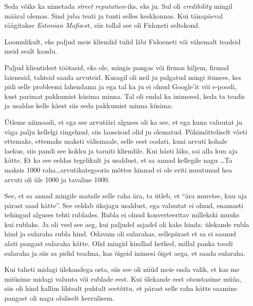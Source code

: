 
Seda võiks ka nimetada \emph{street reputation}-iks, eks ju. Sul oli \emph{credibility} mingil määral olemas. Sind juba teati ja tunti selles keskkonnas. Kui tänapäeval räägitakse \emph{Estonian Mafia}-st, siis tollal see oli Fidoneti seltskond.

Loomulikult, eks paljud meie kliendid tulid läbi Fidoeneti või vähemalt teadsid meid sealt kaudu.

Paljud klientidest töötasid, eks ole, mingis pangas või firmas hiljem, firmad laienesid, tahtsid saada arvuteid. Kusagil oli neil ju palgatud mingi itimees, kes pidi selle probleemi lahendama ja ega tal ka ju ei olnud Google'it või e-poodi, kust  parimat pakkumist küsima minna. Tal oli endal ka inimesed, keda ta teadis ja usaldas kelle käest siis seda pakkumist minna küsima.
                 

Ütleme niimoodi, et ega see arvutiäri alguses oli ka see, et ega kuna valuutat ju väga palju kellelgi ringelnud, siis laoseisud olid ju olematud. Põhimõtteliselt võeti ettemaks, ettemaks maksti välismaale, selle eest oodati, kuni arvuti kohale laekus, siis pandi see kokku ja tarniti kliendile. Kui hästi läks, sai alla kuu aja kätte. Et ka see eeldas tegelikult ju usaldust, et sa annad kellegile nagu \ldots Ta maksis 1000 raha\ldots arvutikategooria mõttes hinnad ei ole eriti muutunud hea arvuti oli üle 1000 ja tavaline 1000.

See, et sa annad mingile matsile selle raha ära, ta ütleb, et \enquote{ära muretse, kuu aja pärast saad kätte}. See eeldab üksjagu usaldust,  ega valuutat ei olnud, enamasti tehingud alguses tehti rublades. Rubla ei olnud konverteeritav millekski muuks kui rublaks. Ja oli veel see aeg, kui paljudel asjadel oli kaks hinda: ülekande rubla hind ja sularaha rubla hind. Odavam oli sularahas, sellepärast et sa ei saanud alati pangast sularaha kätte. Olid mingid kindlad hetked, millal panka toodi sularaha ja siis sa pidid teadma, kas õigeid inimesi õiget aega, et saada sularaha.
                 


Kui taheti midagi ülekandega osta, siis see oli nüüd meie enda valik, et kas me müüsime midagi valuuta või rublade eest. Kui  ülekande eest otsustasime müüa, siis oli hind kallim lihtsalt puhtalt seetõttu, et pärast selle raha kätte saamine pangast oli nagu oluliselt keerulisem.

